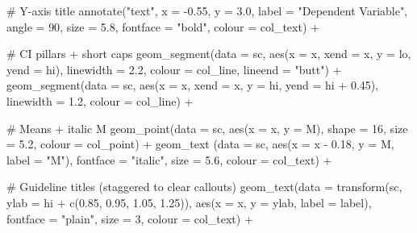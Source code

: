 \documentclass[
  letterpaper,
  DIV=11,
  numbers=noendperiod]{scrreprt}
\newenvironment{Shaded}{\begin{snugshade}}{\end{snugshade}}
\newcommand{\AttributeTok}[1]{\textcolor[rgb]{0.40,0.45,0.13}{#1}}
\newcommand{\CommentTok}[1]{\textcolor[rgb]{0.37,0.37,0.37}{#1}}
\newcommand{\DecValTok}[1]{\textcolor[rgb]{0.68,0.00,0.00}{#1}}
\newcommand{\FloatTok}[1]{\textcolor[rgb]{0.68,0.00,0.00}{#1}}
\newcommand{\FunctionTok}[1]{\textcolor[rgb]{0.28,0.35,0.67}{#1}}
\newcommand{\NormalTok}[1]{\textcolor[rgb]{0.00,0.23,0.31}{#1}}
\newcommand{\SpecialCharTok}[1]{\textcolor[rgb]{0.37,0.37,0.37}{#1}}
\newcommand{\StringTok}[1]{\textcolor[rgb]{0.13,0.47,0.30}{#1}}
\begin{document}
\begin{Shaded}
\begin{Highlighting}[]
  \CommentTok{\# Y{-}axis title}
  \FunctionTok{annotate}\NormalTok{(}\StringTok{"text"}\NormalTok{, }\AttributeTok{x =} \SpecialCharTok{{-}}\FloatTok{0.55}\NormalTok{, }\AttributeTok{y =} \FloatTok{3.0}\NormalTok{, }\AttributeTok{label =} \StringTok{"Dependent Variable"}\NormalTok{,}
           \AttributeTok{angle =} \DecValTok{90}\NormalTok{, }\AttributeTok{size =} \FloatTok{5.8}\NormalTok{, }\AttributeTok{fontface =} \StringTok{"bold"}\NormalTok{, }\AttributeTok{colour =}\NormalTok{ col\_text) }\SpecialCharTok{+}

  \CommentTok{\# CI pillars + short caps}
  \FunctionTok{geom\_segment}\NormalTok{(}\AttributeTok{data =}\NormalTok{ sc, }\FunctionTok{aes}\NormalTok{(}\AttributeTok{x =}\NormalTok{ x, }\AttributeTok{xend =}\NormalTok{ x, }\AttributeTok{y =}\NormalTok{ lo, }\AttributeTok{yend =}\NormalTok{ hi),}
               \AttributeTok{linewidth =} \FloatTok{2.2}\NormalTok{, }\AttributeTok{colour =}\NormalTok{ col\_line, }\AttributeTok{lineend =} \StringTok{"butt"}\NormalTok{) }\SpecialCharTok{+}
  \FunctionTok{geom\_segment}\NormalTok{(}\AttributeTok{data =}\NormalTok{ sc, }\FunctionTok{aes}\NormalTok{(}\AttributeTok{x =}\NormalTok{ x, }\AttributeTok{xend =}\NormalTok{ x, }\AttributeTok{y =}\NormalTok{ hi, }\AttributeTok{yend =}\NormalTok{ hi }\SpecialCharTok{+} \FloatTok{0.45}\NormalTok{),}
               \AttributeTok{linewidth =} \FloatTok{1.2}\NormalTok{, }\AttributeTok{colour =}\NormalTok{ col\_line) }\SpecialCharTok{+}

  \CommentTok{\# Means + italic M}
  \FunctionTok{geom\_point}\NormalTok{(}\AttributeTok{data =}\NormalTok{ sc, }\FunctionTok{aes}\NormalTok{(}\AttributeTok{x =}\NormalTok{ x, }\AttributeTok{y =}\NormalTok{ M),}
             \AttributeTok{shape =} \DecValTok{16}\NormalTok{, }\AttributeTok{size =} \FloatTok{5.2}\NormalTok{, }\AttributeTok{colour =}\NormalTok{ col\_point) }\SpecialCharTok{+}
  \FunctionTok{geom\_text}\NormalTok{ (}\AttributeTok{data =}\NormalTok{ sc, }\FunctionTok{aes}\NormalTok{(}\AttributeTok{x =}\NormalTok{ x }\SpecialCharTok{{-}} \FloatTok{0.18}\NormalTok{, }\AttributeTok{y =}\NormalTok{ M, }\AttributeTok{label =} \StringTok{"M"}\NormalTok{),}
             \AttributeTok{fontface =} \StringTok{"italic"}\NormalTok{, }\AttributeTok{size =} \FloatTok{5.6}\NormalTok{, }\AttributeTok{colour =}\NormalTok{ col\_text) }\SpecialCharTok{+}

  \CommentTok{\# Guideline titles (staggered to clear callouts)}
  \FunctionTok{geom\_text}\NormalTok{(}\AttributeTok{data =} \FunctionTok{transform}\NormalTok{(sc, }\AttributeTok{ylab =}\NormalTok{ hi }\SpecialCharTok{+} \FunctionTok{c}\NormalTok{(}\FloatTok{0.85}\NormalTok{, }\FloatTok{0.95}\NormalTok{, }\FloatTok{1.05}\NormalTok{, }\FloatTok{1.25}\NormalTok{)),}
            \FunctionTok{aes}\NormalTok{(}\AttributeTok{x =}\NormalTok{ x, }\AttributeTok{y =}\NormalTok{ ylab, }\AttributeTok{label =}\NormalTok{ label),}
            \AttributeTok{fontface =} \StringTok{"plain"}\NormalTok{, }\AttributeTok{size =} \DecValTok{3}\NormalTok{, }\AttributeTok{colour =}\NormalTok{ col\_text) }\SpecialCharTok{+}


\end{Highlighting}
\end{Shaded}
\end{document}
